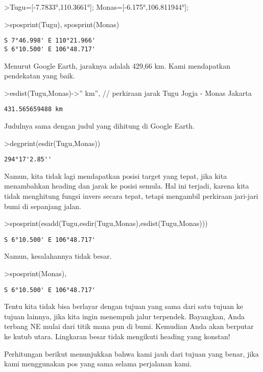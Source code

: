 \documentclass[
]{book}
\begin{document}
\textgreater Tugu={[}-7.7833°,110.3661°{]}; Monas={[}-6.175°,106.811944°{]};

\textgreater sposprint(Tugu), sposprint(Monas)

\begin{verbatim}
S 7°46.998' E 110°21.966'
S 6°10.500' E 106°48.717'
\end{verbatim}

Menurut Google Earth, jaraknya adalah 429,66 km. Kami mendapatkan pendekatan yang baik.

\textgreater esdist(Tugu,Monas)-\textgreater'' km'', // perkiraan jarak Tugu Jogja - Monas Jakarta

\begin{verbatim}
431.565659488 km
\end{verbatim}

Judulnya sama dengan judul yang dihitung di Google Earth.

\textgreater degprint(esdir(Tugu,Monas))

\begin{verbatim}
294°17'2.85''
\end{verbatim}

Namun, kita tidak lagi mendapatkan posisi target yang tepat, jika kita menambahkan heading dan jarak ke posisi semula. Hal ini terjadi, karena kita tidak menghitung fungsi invers secara tepat, tetapi mengambil perkiraan jari-jari bumi di sepanjang jalan.

\textgreater sposprint(esadd(Tugu,esdir(Tugu,Monas),esdist(Tugu,Monas)))

\begin{verbatim}
S 6°10.500' E 106°48.717'
\end{verbatim}

Namun, kesalahannya tidak besar.

\textgreater sposprint(Monas),

\begin{verbatim}
S 6°10.500' E 106°48.717'
\end{verbatim}

Tentu kita tidak bisa berlayar dengan tujuan yang sama dari satu tujuan ke tujuan lainnya, jika kita ingin menempuh jalur terpendek. Bayangkan, Anda terbang NE mulai dari titik mana pun di bumi. Kemudian Anda akan berputar ke kutub utara. Lingkaran besar tidak mengikuti heading yang konstan!

Perhitungan berikut menunjukkan bahwa kami jauh dari tujuan yang benar, jika kami menggunakan pos yang sama selama perjalanan kami.
\end{document}
